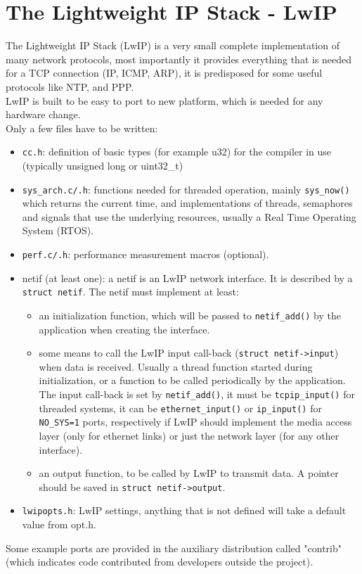 \section{The Lightweight IP Stack - LwIP}\label{lwip}
The Lightweight IP Stack (LwIP) is a very small complete implementation of many network protocols, most importantly it provides everything that is needed for a TCP connection (IP, ICMP, ARP), it is predisposed for some useful protocols like NTP, and PPP.
\\LwIP is built to be easy to port to new platform, which is needed for any hardware change.\\
Only a few files have to be written:
\begin{itemize}
    \item \texttt{cc.h}: definition of basic types (for example u32) for the compiler in use (typically unsigned long or uint32\_t)
    \item \texttt{sys\_arch.c/.h}: functions needed for threaded operation, mainly \texttt{sys\_now()} which returns the current time, and implementations of threads, semaphores and signals that use the underlying resources, usually a Real Time Operating System (RTOS).
    \item \texttt{perf.c/.h}: performance measurement macros (optional).
    \item netif (at least one): a netif is an LwIP network interface. It is described by a \texttt{struct netif}. The netif must implement at least:
    \begin{itemize}
        \item an initialization function, which will be passed to \texttt{netif\_add()} by the application when creating the interface.
        \item some means to call the LwIP input call-back (\texttt{struct netif->input}) when data is received. Usually a thread function started during initialization, or a function to be called periodically by the application. The input call-back is set by \texttt{netif\_add()}, it must be \texttt{tcpip\_input()} for threaded systems, it can be \texttt{ethernet\_input()} or \texttt{ip\_input()} for \texttt{NO\_SYS=1} ports, respectively if LwIP should implement the media access layer (only for ethernet links) or just the network layer (for any other interface).
        \item an output function, to be called by LwIP to transmit data. A pointer should be saved in \texttt{struct netif->output}.
    \end{itemize}
    \item \texttt{lwipopts.h}: LwIP settings, anything that is not defined will take a default value from opt.h.
\end{itemize}
Some example ports are provided in the auxiliary distribution called "contrib" (which indicates code contributed from developers outside the project).

